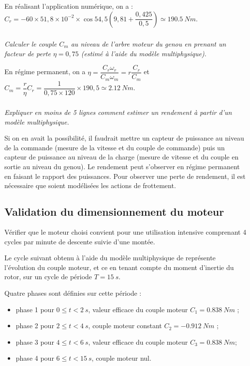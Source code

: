 \begin{multicols}{2}
\begin{corrige}
En réalisant l'application numérique, on a : $C_r = - 60 \times 51,8\times 10^{-2}\times \cos 54,5 \left(9,81 +\dfrac{0,425}{0,5} \right) \simeq \SI{190,5}{Nm} $.


\end{corrige}

\else
\fi

\subparagraph{} \textit{Calculer le couple $C_m$ au niveau de l’arbre moteur du genou en prenant un facteur de perte $\eta = 0,75$ (estimé à l’aide du modèle multiphysique).}
\ifprof
\begin{corrige}
En régime permanent, on a $\eta=\dfrac{C_r \omega_r}{C_m \omega_m}=r\dfrac{C_r}{C_m}$ et $C_m = \dfrac{r}{\eta}C_r=\dfrac{1}{0,75\times 120} \times 190,5 \simeq \SI{2,12}{Nm}$.
\end{corrige}
\else
\fi




\subparagraph{} \textit{Expliquer en moins de 5 lignes comment estimer un rendement à partir d'un modèle multiphysique.}
\ifprof
\begin{corrige}
Si on en avait la possibilité, il faudrait mettre un capteur de puissance au niveau de la commande (mesure de la vitesse et du couple de commande) puis un capteur de puissance au niveau de la charge (mesure de vitesse et du couple en sortie au niveau du genou). Le rendement peut s'observer en régime permanent en faisant le rapport des puissances. 
Pour observer une perte de rendement, il est nécessaire que soient modélisées les actions de frottement.
\end{corrige}
\else
\fi

\subsection*{Validation du dimensionnement du moteur}
\begin{obj}
Vérifier que le moteur choisi convient pour une utilisation intensive comprenant 4 cycles par minute
de descente suivie d’une montée.
\end{obj}

\ifprof
\else

Le cycle suivant obtenu à l’aide du modèle multiphysique de représente l’évolution du couple moteur,
et ce en tenant compte du moment d’inertie du rotor, sur un cycle de période $T=\SI{15}{s}$.


\noindent Quatre phases sont définies sur cette période :
\begin{itemize}
\item phase 1 pour $0 \leq t < \SI{2}{s}$, valeur efficace du couple moteur $C_1 = \SI{0,838}{Nm}$ ;
\item phase 2 pour $2 \leq t < \SI{4}{s}$, couple moteur constant $C_2 = -\SI{0,912}{Nm}$ ;
\item phase 3 pour $4 \leq t < \SI{6}{s}$, valeur efficace du couple moteur $C_3 = \SI{0,838}{Nm}$;
\item phase 4 pour $6 \leq t < \SI{15}{s}$, couple moteur nul.
\end{itemize}




\end{multicols}

